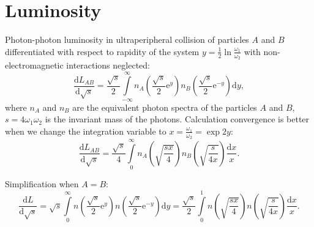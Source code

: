 \documentclass[a4paper,12pt]{article}
\begin{document}
\section{Luminosity}

Photon-photon luminosity in ultraperipheral collision of particles $A$ and $B$
differentiated with respect to rapidity of the system $y = \tfrac12 \ln
\tfrac{\omega_1}{\omega_2}$ with non-electromagnetic interactions neglected:
\begin{equation}
  \frac{\mathrm{d} L_{AB}}{\mathrm{d} \sqrt{s}}
  = \frac{\sqrt{s}}{2}
    \int\limits_{-\infty}^{\infty}
      n_A \left( \frac{\sqrt{s}}{2} \mathrm{e}^y \right)
      n_B \left( \frac{\sqrt{s}}{2} \mathrm{e}^{-y} \right)
    \mathrm{d} y,
\end{equation}
where $n_A$ and $n_B$ are the equivalent photon spectra of the particles $A$ and
$B$, $s = 4 \omega_1 \omega_2$ is the invariant mass of the photons. Calculation
convergence is better when we change the integration variable to $x =
\frac{\omega_1}{\omega_2} = \exp{2 y}$:
\begin{equation}
  \frac{\mathrm{d} L_{AB}}{\mathrm{d} \sqrt{s}}
  = \frac{\sqrt{s}}{4}
    \int\limits_0^\infty
       n_A \left( \sqrt{\frac{sx}{4}} \right)
       n_B \left( \sqrt{\frac{s}{4x}} \right)
       \frac{\mathrm{d} x}{x}.
\end{equation}

Simplification when $A = B$:
\begin{equation}
  \frac{\mathrm {d} L}{\mathrm{d} \sqrt{s}}
  = \sqrt{s}
    \int\limits_0^\infty
      n \left( \frac{\sqrt{s}}{2} \mathrm{e}^y \right)
      n \left( \frac{\sqrt{s}}{2} \mathrm{e}^{-y} \right)
    \mathrm{d} y
  = \frac{\sqrt{s}}{2}
    \int\limits_0^1
      n \left( \sqrt{\frac{sx}{4}} \right)
      n \left( \sqrt{\frac{s}{4x}} \right)
      \frac{\mathrm{d} x}{x}.
\end{equation}
\end{document}
